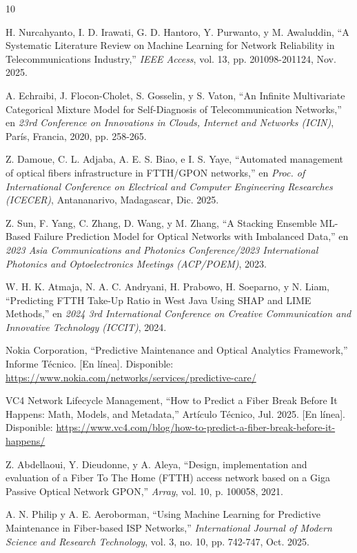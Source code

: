 \documentclass[12pt,a4paper]{article}
\begin{document}
\begin{thebibliography}{10}

H. Nurcahyanto, I. D. Irawati, G. D. Hantoro, Y. Purwanto, y M. Awaluddin, ``A Systematic Literature Review on Machine Learning for Network Reliability in Telecommunications Industry,'' \textit{IEEE Access}, vol. 13, pp. 201098-201124, Nov. 2025.

A. Echraibi, J. Flocon-Cholet, S. Gosselin, y S. Vaton, ``An Infinite Multivariate Categorical Mixture Model for Self-Diagnosis of Telecommunication Networks,'' en \textit{23rd Conference on Innovations in Clouds, Internet and Networks (ICIN)}, París, Francia, 2020, pp. 258-265.

Z. Damoue, C. L. Adjaba, A. E. S. Biao, e I. S. Yaye, ``Automated management of optical fibers infrastructure in FTTH/GPON networks,'' en \textit{Proc. of International Conference on Electrical and Computer Engineering Researches (ICECER)}, Antananarivo, Madagascar, Dic. 2025.

Z. Sun, F. Yang, C. Zhang, D. Wang, y M. Zhang, ``A Stacking Ensemble ML-Based Failure Prediction Model for Optical Networks with Imbalanced Data,'' en \textit{2023 Asia Communications and Photonics Conference/2023 International Photonics and Optoelectronics Meetings (ACP/POEM)}, 2023.

W. H. K. Atmaja, N. A. C. Andryani, H. Prabowo, H. Soeparno, y N. Liam, ``Predicting FTTH Take-Up Ratio in West Java Using SHAP and LIME Methods,'' en \textit{2024 3rd International Conference on Creative Communication and Innovative Technology (ICCIT)}, 2024.

Nokia Corporation, ``Predictive Maintenance and Optical Analytics Framework,'' Informe Técnico. [En línea]. Disponible: \url{https://www.nokia.com/networks/services/predictive-care/}

VC4 Network Lifecycle Management, ``How to Predict a Fiber Break Before It Happens: Math, Models, and Metadata,'' Artículo Técnico, Jul. 2025. [En línea]. Disponible: \url{https://www.vc4.com/blog/how-to-predict-a-fiber-break-before-it-happens/}

Z. Abdellaoui, Y. Dieudonne, y A. Aleya, ``Design, implementation and evaluation of a Fiber To The Home (FTTH) access network based on a Giga Passive Optical Network GPON,'' \textit{Array}, vol. 10, p. 100058, 2021.

A. N. Philip y A. E. Aeroborman, ``Using Machine Learning for Predictive Maintenance in Fiber-based ISP Networks,'' \textit{International Journal of Modern Science and Research Technology}, vol. 3, no. 10, pp. 742-747, Oct. 2025.

\end{thebibliography}
\end{document}
